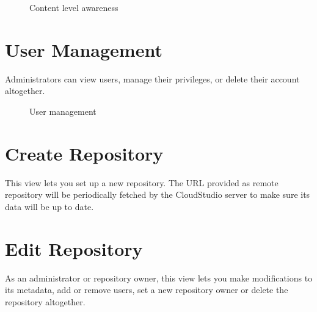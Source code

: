 \begin{figure}[h!]
  \centering
  \caption{Content level awareness}
  \label{fig:contentlevel}
\end{figure}





\section{User Management}

Administrators can view users, manage their privileges, or delete their account altogether.






\begin{figure}[h!]
  \centering
  \caption{User management}
  \label{fig:manageusers}
\end{figure}





\section{Create Repository}

This view lets you set up a new repository. The URL provided as remote repository will be periodically fetched by the CloudStudio server to make sure its data will be up to date.



\section{Edit Repository}

As an administrator or repository owner, this view lets you make modifications to its metadata, add or remove users, set a new repository owner or delete the repository altogether.

